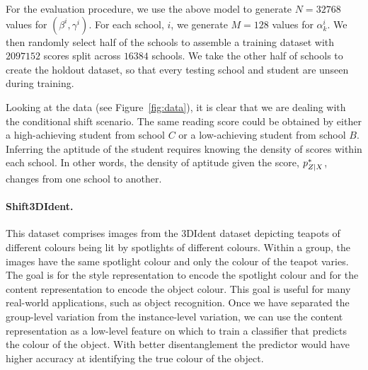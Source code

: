 \documentclass[../thesis.tex]{subfiles}
\begin{document}
For the evaluation procedure, we use the above model to generate $N=\num{32768}$ values for $\left(\beta^i, \gamma^i\right)$. For each school, $i$, we generate $M=128$ values for $\alpha^i_k$. We then randomly select half of the schools to assemble a training dataset with $\num{2097152}$ scores split across $\num{16384}$ schools. We take the other half of schools to create the holdout dataset, so that every testing school and student are unseen during training. 

Looking at the data (see Figure~\ref{fig:data}), it is clear that we are dealing with the conditional shift scenario. The same reading score could be obtained by either a high-achieving student from school $C$ or a low-achieving student from school $B$. Inferring the aptitude of the student requires knowing the density of scores within each school. In other words, the density of aptitude given the score, $\myfunc{p}^{*}_{\myrv{z} | \myrv{x}}$, changes from one school to another. 


\paragraph{Shift3DIdent.} This dataset comprises images from the 3DIdent dataset \citep{zimmermannContrastiveLearningInverts2021} depicting teapots of different colours being lit by spotlights of different colours. Within a group, the images have the same spotlight colour and only the colour of the teapot varies.  The goal is for the style representation to encode the spotlight colour and for the content representation to encode the object colour. This goal is useful for many real-world applications, such as object recognition. Once we have separated the group-level variation from the instance-level variation, we can use the content representation as a low-level feature on which to train a classifier that predicts the colour of the object. With better disentanglement the predictor would have higher accuracy at identifying the true colour of the object.

\end{document}

